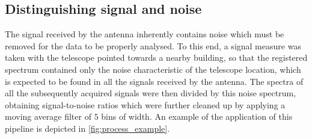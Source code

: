 \subsection{Distinguishing signal and noise}
The signal received by the antenna inherently contains noise which must be removed for the data to be properly analysed.
To this end, a signal measure was taken with the telescope pointed towards a nearby building, so that the registered spectrum  contained only the noise characteristic of the telescope location, which is expected to be found in all the signals received by the antenna.
The spectra of all the subsequently acquired signals were then divided by this noise spectrum, obtaining  signal-to-noise ratios which were further cleaned up by applying a moving average filter of $5$ bins of width.
An example of the application of this pipeline is depicted in \autoref{fig:process_example}.

